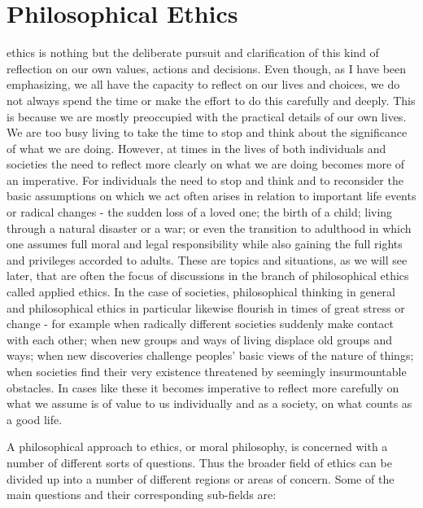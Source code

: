 \documentclass[justified]{tufte-book}
\begin{document}
\hypertarget{philosophical-ethics}{%
\section{Philosophical Ethics}\label{philosophical-ethics}}

 ethics is nothing but the deliberate pursuit and clarification of this kind of reflection on our own values, actions and decisions. Even though, as I have been emphasizing, we all have the capacity to reflect on our lives and choices, we do not always spend the time or make the effort to do this carefully and deeply. This is because we are mostly preoccupied with the practical details of our own lives. We are too busy living to take the time to stop and think about the significance of what we are doing. However, at times in the lives of both individuals and societies the need to reflect more clearly on what we are doing becomes more of an imperative. For individuals the need to stop and think and to reconsider the basic assumptions on which we act often arises in relation to important life events or radical changes - the sudden loss of a loved one; the birth of a child; living through a natural disaster or a war; or even the transition to adulthood in which one assumes full moral and legal responsibility while also gaining the full rights and privileges accorded to adults. These are topics and situations, as we will see later, that are often the focus of discussions in the branch of philosophical ethics called applied ethics. In the case of societies, philosophical thinking in general and philosophical ethics in particular likewise flourish in times of great stress or change - for example when radically different societies suddenly make contact with each other; when new groups and ways of living displace old groups and ways; when new discoveries challenge peoples' basic views of the nature of things; when societies find their very existence threatened by seemingly insurmountable obstacles. In cases like these it becomes imperative to reflect more carefully on what we assume is of value to us individually and as a society, on what counts as a good life.

A philosophical approach to ethics, or moral philosophy, is concerned with a number of different sorts of questions. Thus the broader field of ethics can be divided up into a number of different regions or areas of concern. Some of the main questions and their corresponding sub-fields are:
\end{document}
